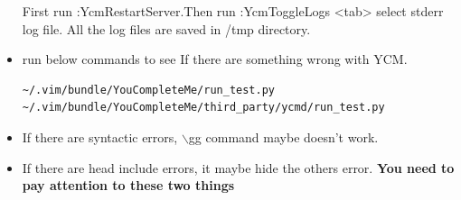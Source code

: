 \documentclass[a4paper,12pt,twoside]{book}
\begin{document}
\begin{itemize}
First run :YcmRestartServer.Then run :YcmToggleLogs <tab> select stderr log file. All the log files are saved in /tmp directory. 

\item run below commands to see If there are something wrong with YCM. 	
\begin{verbatim}
~/.vim/bundle/YouCompleteMe/run_test.py
~/.vim/bundle/YouCompleteMe/third_party/ycmd/run_test.py
\end{verbatim}
\item If there are syntactic errors, $\backslash$gg command maybe doesn't work. 
\item If there are head include errors, it maybe hide the others error. \textbf{You need to pay attention to these two things}
\end{itemize}
\end{document}
